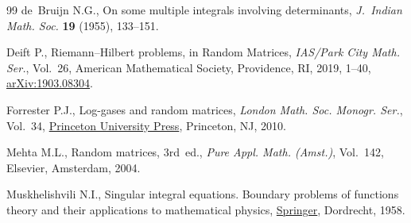 \documentclass[11pt]{article}
\numberwithin{equation}{section}
\numberwithin{equation}{section}
\begin{document}
\begin{thebibliography}{99}
de~Bruijn N.G., On some multiple integrals involving determinants, \textit{J.~Indian Math. Soc.} \textbf{19} (1955), 133--151.

Deift P., Riemann--{H}ilbert problems, in Random {M}atrices, \textit{IAS/Park
 City Math. Ser.}, Vol.~26, American Mathematical Society, Providence, RI,
 2019, 1--40, \href{https://arxiv.org/abs/1903.08304}{arXiv:1903.08304}.

Forrester P.J., Log-gases and random matrices, \textit{London Math. Soc.
 Monogr. Ser.}, Vol.~34, \href{https://doi.org/10.1515/9781400835416}{Princeton University Press}, Princeton, NJ, 2010.

Mehta M.L., Random matrices, 3rd~ed., \textit{Pure Appl. Math. (Amst.)}, Vol.~142, Elsevier, Amsterdam, 2004.

Muskhelishvili N.I., Singular integral equations. Boundary problems of
 functions theory and their applications to mathematical physics, \href{https://doi.org/10.1007/978-94-009-9994-7}{Springer},
 Dordrecht, 1958.

\end{thebibliography}
\end{document}

